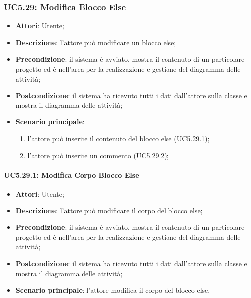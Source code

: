 \subsubsection{UC5.29: Modifica Blocco Else}
\label{UC5.29}
\begin{itemize}
	\item \textbf{Attori}: Utente;
	\item \textbf{Descrizione}: l'attore può modificare un blocco else;
	\item \textbf{Precondizione}: il sistema è avviato, mostra il contenuto di un particolare progetto ed è nell'area per la realizzazione e gestione del diagramma delle attività;
	\item \textbf{Postcondizione}: il sistema ha ricevuto tutti i dati dall'attore sulla classe e mostra il diagramma delle attività;
	\item \textbf{Scenario principale}:
	\begin{enumerate}
		\item l'attore può inserire il contenuto del blocco else (UC5.29.1);
		\item l'attore può inserire un commento (UC5.29.2);
	\end{enumerate}
\end{itemize}

\paragraph{UC5.29.1: Modifica Corpo Blocco Else}
\label{UC5.29.1}
\begin{itemize}
	\item \textbf{Attori}: Utente;
	\item \textbf{Descrizione}: l'attore può modificare il corpo del blocco else;
	\item \textbf{Precondizione}: il sistema è avviato, mostra il contenuto di un particolare progetto ed è nell'area per la realizzazione e gestione del diagramma delle attività;
	\item \textbf{Postcondizione}: il sistema ha ricevuto tutti i dati dall'attore sulla classe e mostra il diagramma delle attività;
	\item \textbf{Scenario principale}: l'attore modifica il corpo del blocco else.
\end{itemize}

